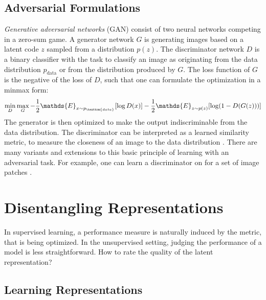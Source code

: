 	\subsection{Adversarial Formulations}\label{sec:adversarial}
		\textit{Generative adversarial networks} (GAN) \cite{goodfellow14gan} consist of two neural networks competing in a zero-sum game. A generator network $G$ is generating images based on a latent code $z$ sampled from a distribution $p(z)$. The discriminator network $D$ is a binary classifier with the task to classify an image as originating from the data distribution $p_{\textrm{data}}$ or from the distribution produced by $G$. The loss function of $G$ is the negative of the loss of $D$, such that one can formulate the optimization in a minmax form:
		\begin{equation}
			\min_D \max_G - \frac{1}{2} \mathds{E}_{x\sim p_{\texttrm{data}}}[\log D(x)] - \frac{1}{2}\mathds{E}_{z\sim p(z)}[\log (1-D(G(z)))]
		\end{equation}
		The generator is then optimized to make the output indiscriminable from the data distribution.
		The discriminator can be interpreted as a learned similarity metric, to measure the closeness of an image to the data distribution \cite{larsen15vaegan}.
		There are many variants and extensions to this basic principle of learning with an adversarial task. For example, one can learn a discriminator on for a set of image patches \cite{isola17image2image}. 

\section{Disentangling Representations}\label{sec:disentangled}
	In supervised learning, a performance measure is naturally induced by the metric, that is being optimized. In the unsupervised setting, judging the performance of a model is less straightforward.
	How to rate the quality of the latent representation?

	\subsection{Learning Representations}


